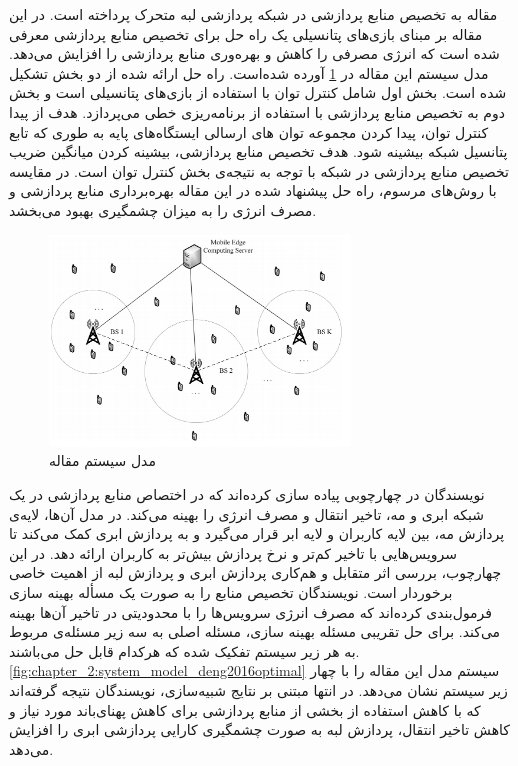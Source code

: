     مقاله \cite{heng2019computing} به تخصیص منابع پردازشی در شبکه پردازشی لبه متحرک پرداخته است.
    در این مقاله بر مبنای بازی‌های پتانسیلی یک راه حل برای تخصیص منابع پردازشی معرفی شده است که انرژی مصرفی را کاهش و بهره‌وری منابع پردازشی را افزایش می‌دهد.
    مدل سیستم این مقاله در \cref{fig:chapter_2:system_model_heng2019computing} آورده شده‌است.
    راه حل ارائه شده از دو بخش تشکیل شده است.
    بخش اول شامل کنترل توان با استفاده از بازی‌های پتانسیلی است و بخش دوم به تخصیص منابع پردازشی با استفاده از برنامه‌ریزی خطی می‌پردازد.
    هدف از پیدا کنترل توان، پیدا کردن مجموعه توان ‌های ارسالی ایستگاه‌های پایه به طوری که تابع پتانسیل شبکه بیشینه شود.
    هدف تخصیص منابع پردازشی، بیشینه کردن میانگین ضریب تخصیص منابع پردازشی در شبکه با توجه به نتیجه‌ی بخش کنترل توان است.
    در مقایسه با روش‌های مرسوم، راه حل پیشنهاد شده در این مقاله بهره‌برداری منابع پردازشی و مصرف انرژی را به میزان چشمگیری بهبود می‌بخشد.

    \begin{figure}[h]
      \centerline{\includegraphics[width=8cm]{graphics/chapter_2/system_model_heng2019computing}}
      \caption{مدل سیستم مقاله \cite{heng2019computing}}
      \label{fig:chapter_2:system_model_heng2019computing}
    \end{figure}

    نویسندگان در \cite{deng2016optimal} چهارچوبی پیاده سازی کرده‌اند که در اختصاص منابع پردازشی در یک شبکه ابری و مه، تاخیر انتقال و مصرف انرژی را بهینه می‌کند.
    در مدل آن‌ها، لایه‌ی پردازش مه، بین لایه کاربران و لایه‌ ابر قرار می‌گیرد و به پردازش ابری کمک می‌کند تا سرویس‌هایی با تاخیر کم‌تر و نرخ پردازش بیش‌تر به کاربران ارائه دهد.
    در این چهارچوب، بررسی اثر متقابل و هم‌کاری پردازش ابری و پردازش لبه از اهمیت خاصی برخوردار است.
    نویسندگان تخصیص منابع را به صورت یک مسأله بهینه سازی فرمول‌بندی کرده‌اند که مصرف انرژی سرویس‌ها را با محدودیتی در تاخیر آن‌ها بهینه می‌کند.
    برای حل تقریبی مسئله بهینه سازی، مسئله اصلی به سه زیر مسئله‌ی مربوط به هر زیر سیستم تفکیک شده که هرکدام قابل حل می‌باشند.
    \cref{fig:chapter_2:system_model_deng2016optimal} سیستم مدل این مقاله را با چهار زیر سیستم نشان می‌دهد.
    در انتها مبتنی بر نتایج شبیه‌سازی، نویسندگان نتیجه گرفته‌اند که با کاهش استفاده از بخشی از منابع پردازشی برای کاهش پهنای‌باند مورد نیاز و کاهش تاخیر انتقال، پردازش لبه به صورت چشمگیری کارایی پردازشی ابری را افزایش می‌دهد.

